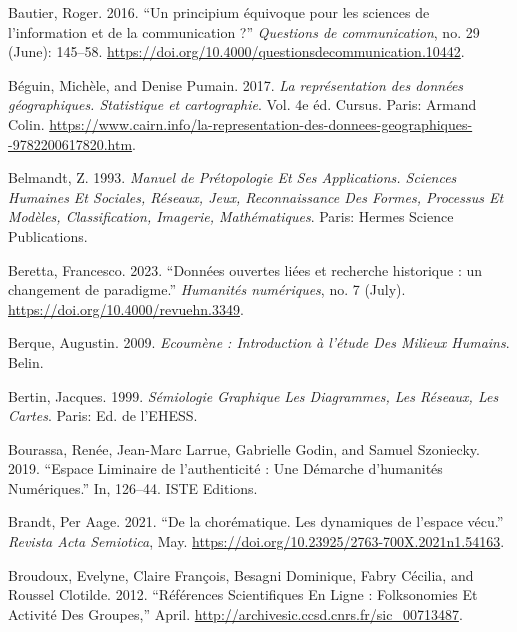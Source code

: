 \documentclass[
  letterpaper,
  DIV=11,
  numbers=noendperiod]{scrreprt}
\newlength{\cslhangindent}
\newlength{\cslentryspacingunit} %
\newenvironment{CSLReferences}[2] %
 {%
  \setlength{\parindent}{0pt}
  \ifodd #1
  \let\oldpar\par
  \def\par{\hangindent=\cslhangindent\oldpar}
  \fi
  \setlength{\parskip}{#2\cslentryspacingunit}
 }%
 {}
\begin{document}
\begin{CSLReferences}{1}{0}
\leavevmode{}%
Bautier, Roger. 2016. {``Un principium équivoque pour les sciences de
l{'}information et de la communication ?''} \emph{Questions de
communication}, no. 29 (June): 145--58.
\url{https://doi.org/10.4000/questionsdecommunication.10442}.

\leavevmode{}%
Béguin, Michèle, and Denise Pumain. 2017. \emph{La représentation des
données géographiques. Statistique et cartographie}. Vol. 4e éd. Cursus.
Paris: Armand Colin.
\url{https://www.cairn.info/la-representation-des-donnees-geographiques--9782200617820.htm}.

\leavevmode{}%
Belmandt, Z. 1993. \emph{Manuel de Prétopologie Et Ses Applications.
Sciences Humaines Et Sociales, Réseaux, Jeux, Reconnaissance Des Formes,
Processus Et Modèles, Classification, Imagerie, Mathématiques}. Paris:
Hermes Science Publications.

\leavevmode{}%
Beretta, Francesco. 2023. {``Données ouvertes liées et recherche
historique : un changement de paradigme.''} \emph{Humanités numériques},
no. 7 (July). \url{https://doi.org/10.4000/revuehn.3349}.

\leavevmode{}%
Berque, Augustin. 2009. \emph{Ecoumène : Introduction à l'étude Des
Milieux Humains}. Belin.

\leavevmode{}%
Bertin, Jacques. 1999. \emph{Sémiologie Graphique Les Diagrammes, Les
Réseaux, Les Cartes}. Paris: Ed. de l'EHESS.

\leavevmode{}%
Bourassa, Renée, Jean-Marc Larrue, Gabrielle Godin, and Samuel
Szoniecky. 2019. {``Espace Liminaire de l{'}authenticité : Une Démarche
d{'}humanités Numériques.''} In, 126--44. ISTE Editions.

\leavevmode{}%
Brandt, Per Aage. 2021. {``De la chorématique. Les dynamiques de
l{'}espace vécu.''} \emph{Revista Acta Semiotica}, May.
\url{https://doi.org/10.23925/2763-700X.2021n1.54163}.

\leavevmode{}%
Broudoux, Evelyne, Claire François, Besagni Dominique, Fabry Cécilia,
and Roussel Clotilde. 2012. {``Références Scientifiques En Ligne :
Folksonomies Et Activité Des Groupes,''} April.
\url{http://archivesic.ccsd.cnrs.fr/sic_00713487}.


\end{CSLReferences}
\end{document}
